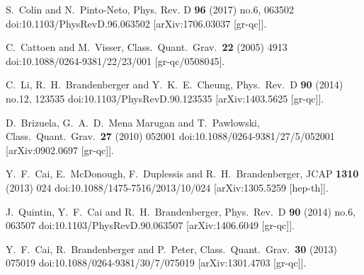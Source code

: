 \documentclass{article}
\begin{document}
\begin{thebibliography}{99}
S.~Colin and N.~Pinto-Neto,
Phys. Rev. D \textbf{96} (2017) no.6, 063502
doi:10.1103/PhysRevD.96.063502
[arXiv:1706.03037 [gr-qc]].





C.~Cattoen and M.~Visser,
Class.\ Quant.\ Grav.\ {\bf 22} (2005) 4913
doi:10.1088/0264-9381/22/23/001
[gr-qc/0508045].




C.~Li, R.~H.~Brandenberger and Y.~K.~E.~Cheung,
Phys.\ Rev.\ D {\bf 90} (2014) no.12, 123535
doi:10.1103/PhysRevD.90.123535
[arXiv:1403.5625 [gr-qc]].




D.~Brizuela, G.~A.~D.~Mena Marugan and T.~Pawlowski,
Class.\ Quant.\ Grav.\ {\bf 27} (2010) 052001
doi:10.1088/0264-9381/27/5/052001
[arXiv:0902.0697 [gr-qc]].



Y.~F.~Cai, E.~McDonough, F.~Duplessis and R.~H.~Brandenberger,
JCAP {\bf 1310} (2013) 024
doi:10.1088/1475-7516/2013/10/024
[arXiv:1305.5259 [hep-th]].


J.~Quintin, Y.~F.~Cai and R.~H.~Brandenberger,
Phys.\ Rev.\ D {\bf 90} (2014) no.6, 063507
doi:10.1103/PhysRevD.90.063507
[arXiv:1406.6049 [gr-qc]].


Y.~F.~Cai, R.~Brandenberger and P.~Peter,
Class.\ Quant.\ Grav.\ {\bf 30} (2013) 075019
doi:10.1088/0264-9381/30/7/075019
[arXiv:1301.4703 [gr-qc]].



\end{thebibliography}
\end{document}
